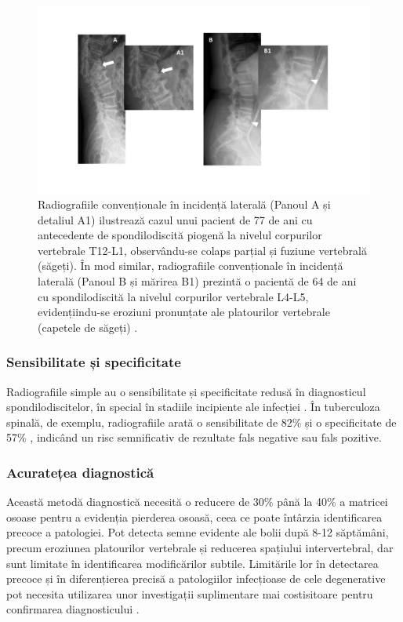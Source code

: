 \message{ !name(LaMain.tex)}\documentclass[romanian,12pt,a4paper]{article}
\begin{document}
\begin{figure}\label{rx-general}
\centering
\includegraphics[width=\textwidth]{Files/rx-general.png}
\caption{Radiografiile convenționale în incidență laterală (Panoul A și
detaliul A1) ilustrează cazul unui pacient de 77 de ani cu antecedente de
spondilodiscită piogenă la nivelul corpurilor vertebrale T12-L1,
observându-se colaps parțial și fuziune vertebrală (săgeți). În mod
similar, radiografiile convenționale în incidență laterală (Panoul B și
mărirea B1) prezintă o pacientă de 64 de ani cu spondilodiscită la
nivelul corpurilor vertebrale L4-L5, evidențiindu-se eroziuni pronunțate
ale platourilor vertebrale (capetele de săgeți)
\cite{ImagingSpondylodiscitisComprehensive2024}.}
\end{figure}


\subsubsection{Sensibilitate și specificitate}

Radiografiile simple au o sensibilitate și specificitate redusă în
diagnosticul spondilodiscitelor, în special în stadiile incipiente ale
infecției
\cite{SuggestionsManagingPyogenic2007}\cite{SpinalInfections2005}\cite{ImagingSpondylodiscitisComprehensive2024}.
În tuberculoza spinală, de exemplu, radiografiile arată o sensibilitate
de 82\% și o specificitate de 57\% \cite{SpinalInfectionsClinical2014},
indicând un risc semnificativ de rezultate fals negative sau fals
pozitive.

\subsubsection{Acuratețea diagnostică}

Această metodă diagnostică necesită o reducere de 30\% până la 40\% a
matricei osoase pentru a evidenția pierderea osoasă, ceea ce poate
întârzia identificarea precoce a patologiei. Pot detecta semne evidente
ale bolii după 8-12 săptămâni, precum eroziunea platourilor vertebrale
și reducerea spațiului intervertebral, dar sunt limitate în
identificarea modificărilor subtile. Limitările lor în detectarea
precoce și în diferențierea precisă a patologiilor infecțioase de cele
degenerative pot necesita utilizarea unor investigații suplimentare mai
costisitoare pentru confirmarea diagnosticului
\cite{SpinalInfectionsClinical2014}.
\end{document}
